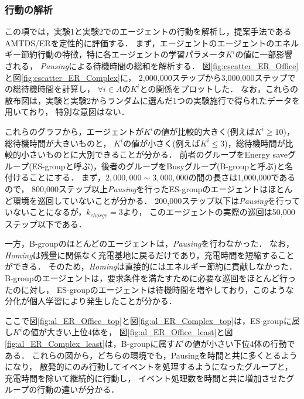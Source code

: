 \documentclass[12pt,a4j,twoside]{jarticle}
\def\AgentSet{A}
\begin{document}
  \subsubsection{行動の解析}\label{sec:expAnalsis}
  この項では，実験1と実験2でのエージェントの行動を解析し，提案手法であるAMTDS/ERを定性的に評価する．
  まず，エージェントのエージェントのエネルギー節約行動の特徴，特に各エージェントの学習パラメータ$K^i$の値に一部影響される，
  {\em Pausing}による待機時間の総和を解析する．
  図\ref{fig:cscatter_ER_Office}と図\ref{fig:cscatter_ER_Complex}に，
  2,000,000ステップから3,000,000ステップでの総待機時間を計算し，
  $\forall i\in\AgentSet$の$K^i$との関係をプロットした．
  なお，これらの散布図は，実験と実験2からランダムに選んだ1つの実験施行で得られたデータを用いており，
  特別な意図はない．
  \par

  これらのグラフから，エージェントが$K^i$の値が比較的大きく(例えば$K^i\geq 10$)，総待機時間が大きいものと，
  $K^i$の値が小さく(例えば$K^i\leq 3$)，総待機時間が比較的小さいものとに大別できることが分かる．
  前者のグループをEnergy saveグループ(ES-groupと呼ぶ)，後者のグループをBusyグループ(B-groupと呼ぶ)と名付けることにする．
  まず，$2,000,000 \sim 3,000,000$の間の長さは1,000,000であるので，
  800,000ステップ以上{\em Pausing}を行ったES-groupのエージェントはほとんど環境を巡回していないことが分かる．
  200,000ステップ以下は{\em Pausing}を行っていないことになるが，$k_{charge} = 3$より，
  このエージェントの実際の巡回は50,000ステップ以下である．
  \par

  一方，B-groupのほとんどのエージェントは，{\em Pausing}を行わなかった．
  なお，{\em Homing}は残量に関係なく充電基地に戻るだけであり，充電時間を短縮することができる．
  そのため，{\em Homing}は直接的にはエネルギー節約に貢献しなかった．
  B-groupのエージェントは，要求条件を満たすために必要な巡回をほとんど行ったのに対し，
  ES-groupのエージェントは待機時間を増やしており，このような分化が個人学習により発生したことが分かる．
  \par

  ここで図\ref{fig:al_ER_Office_top}と図\ref{fig:al_ER_Complex_top}は，ES-groupに属し$K^i$の値が大きい上位4体を，
  図\ref{fig:al_ER_Office_least}と図\ref{fig:al_ER_Complex_least}は，B-groupに属す$K^i$の値が小さい下位4体の行動である．
  これらの図から，どちらの環境でも，Pausingを時間と共に多くとるようになり，
  散発的にのみ行動してイベントを処理するようになったグループと，充電時間を除いて継続的に行動し，
  イベント処理数を時間と共に増加させたグループの行動の違いが分かる．
  \par
\end{document}
